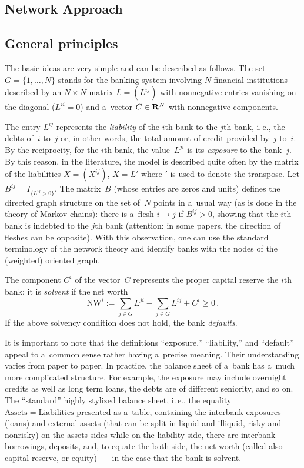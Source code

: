 \begin{multicols}{2}
\section{Network Approach} 

\subsection{General principles}

\noindent
The basic ideas are very simple and can be described as follows. The set 
$G=\{1,\ldots ,N\}$ stands for the banking system involving  $N$ financial 
institutions  described by an $N\times N$ matrix $L=(L^{ij})$ with
nonnegative entries vanishing on the diagonal ($L^{ii}=0$) and a~vector $C\in 
{\bf R}^N$ with nonnegative components. 

The entry $L^{ij}$ represents the {\it  liability} of the $i$th bank to the 
$j$th bank, i.\,e.,  the debts  of~$i$ to~$j$ or, in other words, the total amount 
of credit provided by~$j$ to~$i$. By the reciprocity, for the $i$th bank, the 
value~$L^{ji}$ is its {\it  exposure} to the bank~$j$.  By this reason, in the 
literature, the model  is described quite often by the matrix of the liabilities 
$X=(X^{ij})$, $X=L'$ where $'$ is used to denote the transpose.   Let 
$B^{ij}=I_{\{L^{ij}>0\}}$. The matrix~$B$ (whose entries are zeros and units) 
defines the directed graph structure on the set of~$N$ points in a~usual way (as 
is done in the theory of Markov chains): there is a~flesh $i\to j$ if 
$B^{ij}>0$, showing that  the $i$th bank is indebted  to the $j$th bank 
(attention: in some papers, the direction of fleshes can be opposite). With this 
observation, one can use the standard terminology of the network theory and 
identify banks with the nodes of the (weighted) oriented graph. 

The component $C^i$ of the vector~$C$ represents the proper capital  reserve the 
$i$th bank; it is {\it  solvent}
if the net worth 
\begin{equation*}
\mathrm{NW}^i:=\sum\limits_{j\in G}L^{ji}-\sum\limits_{j\in G}L^{ij}+  C^i\ge 0\,.
\end{equation*}
If the above solvency condition does not hold, the bank {\it defaults}. 

It is important to note that the definitions ``exposure,'' ``liability,'' and
``default'' 
appeal to a~common sense rather having a~precise meaning. Their understanding 
varies from paper to paper. 
In practice, the balance sheet of a~bank has a~much more complicated structure. 
For example, the exposure may include
overnight credits as well as long term loans,  the debts are of different 
seniority, and so on. The ``standard'' highly stylized balance sheet,  i.\,e., 
the equality $\mathrm{Assets}=\mathrm{Liabilities}$ presented as a~table, containing 
the interbank exposures (loans) and external assets (that can be split in 
liquid and illiquid, risky and nonrisky) on the assets 
sides  while on the liability side, there are 
interbank borrowings, deposits, and, to equate the both side, the net worth 
(called also capital reserve, or equity)~---  in the case that the bank is 
solvent.  


\end{multicols}
